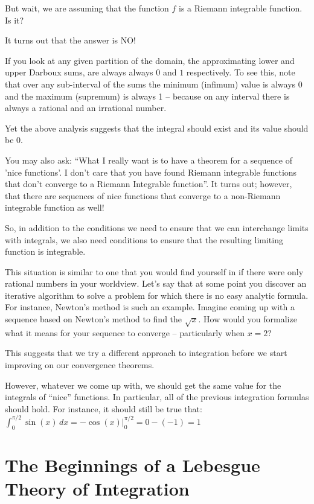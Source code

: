 \documentclass{article}
\begin{document}
But wait, we are assuming that the function $f$ is a Riemann integrable function. 
Is it?

It turns out that the answer is NO! 

If you look at any given partition of the domain, the approximating lower 
and upper Darboux sums, are always 
always $0$ and $1$ respectively. To see this, note that 
over any sub-interval of the sums the minimum (infimum) value is always 0 and 
the maximum (supremum) is always 1 -- because on any interval there is always a 
rational and an irrational number.

Yet the above analysis suggests that the integral should exist and its value 
should be $0$.


You may also ask: ``What I really want is to have a theorem for a sequence of 
'nice functions'. I don't care that you have found Riemann integrable functions that
don't converge to a Riemann Integrable function''. 
It turns out; however, that there are sequences of nice functions that converge 
to a non-Riemann integrable function as well!

So, in addition to the conditions we need to ensure that we can interchange 
limits with integrals, we also need conditions to ensure that the 
resulting limiting function is integrable.

This situation is similar to one that you would find yourself in if there were 
only rational numbers in your worldview. Let's say that at some point 
you discover an iterative 
algorithm to solve a problem for which there is no easy analytic formula. 
For instance, Newton's method is such an example. Imagine coming up with a sequence 
based on Newton's method to find the $\sqrt{x}$. How would you formalize what 
it means for your sequence to converge -- particularly when $x = 2$?

This suggests that we try a different approach to integration before we start 
improving on our convergence theorems. 

However, whatever we come up with, we should get the same value for the 
integrals of ``nice'' functions. In particular, all of the previous integration 
formulas should hold. For instance, it should still be true that: 
$\int_0^{\pi / 2} \sin(x) \, dx = -\cos(x)|_{0}^{\pi / 2} = 0 - (-1) = 1$


\section{The Beginnings of a Lebesgue Theory of Integration}
\end{document}
